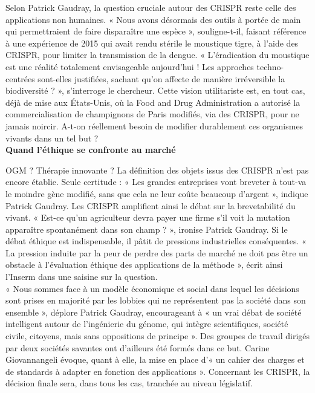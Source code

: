 \documentclass[8pt]{article}
\begin{document}
Selon Patrick Gaudray, la question cruciale autour des CRISPR reste celle des applications non humaines. « Nous avons désormais des outils à portée de main qui permettraient de faire disparaître une espèce », souligne-t-il, faisant référence à une expérience de 2015 qui avait rendu stérile le moustique tigre, à l’aide des CRISPR, pour limiter la transmission de la dengue. « L’éradication du moustique est une réalité totalement envisageable aujourd’hui ! Les approches techno-centrées sont-elles justifiées, sachant qu’on affecte de manière irréversible la biodiversité ? », s’interroge le chercheur. Cette vision utilitariste est, en tout cas, déjà de mise aux États-Unis, où la Food and Drug Administration a autorisé la commercialisation de champignons de Paris modifiés, via des CRISPR, pour ne jamais noircir. A-t-on réellement besoin de modifier durablement ces organismes vivants dans un tel but ? \\

\textbf{Quand l’éthique se confronte au marché} 

OGM ? Thérapie innovante ? La définition des objets issus des CRISPR n’est pas encore établie. Seule certitude : « Les grandes entreprises vont breveter à tout-va le moindre gène modifié, sans que cela ne leur coûte beaucoup d’argent », indique Patrick Gaudray. Les CRISPR amplifient ainsi le débat sur la brevetabilité du vivant. « Est-ce qu’un agriculteur devra payer une firme s’il voit la mutation apparaître spontanément dans son champ ? », ironise Patrick Gaudray. Si le débat éthique est indispensable, il pâtit de pressions industrielles conséquentes. « La pression induite par la peur de perdre des parts de marché ne doit pas être un obstacle à l’évaluation éthique des applications de la méthode », écrit ainsi l’Inserm dans une saisine sur la question. \\

« Nous sommes face à un modèle économique et social dans lequel les décisions sont prises en majorité par les lobbies qui ne représentent pas la société dans son ensemble », déplore Patrick Gaudray, encourageant à « un vrai débat de société intelligent autour de l’ingénierie du génome, qui intègre scientifiques, société civile, citoyens, mais sans oppositions de principe ». Des groupes de travail dirigés par deux sociétés savantes ont d’ailleurs été formés dans ce but. Carine Giovannangeli évoque, quant à elle, la mise en place d’« un cahier des charges et de standards à adapter en fonction des applications ». Concernant les CRISPR, la décision finale sera, dans tous les cas, tranchée au niveau législatif. \\
\end{document}

